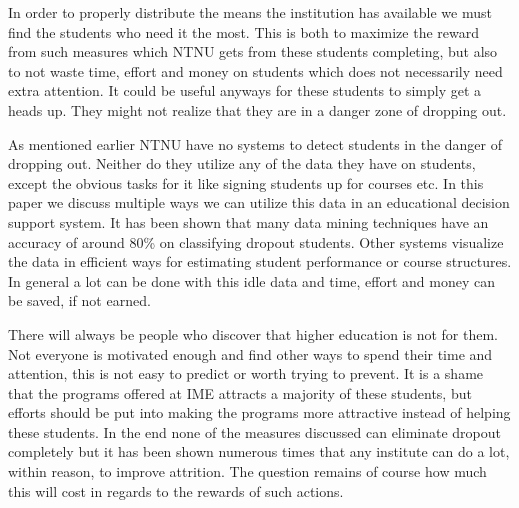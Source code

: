 \bigskip\noindent
In order to properly distribute the means the institution has available we must find the students who need it the most.
This is both to maximize the reward from such measures which NTNU gets from these students completing, but also to not waste time, effort and money on students which does not necessarily need extra attention.
It could be useful anyways for these students to simply get a heads up.
They might not realize that they are in a danger zone of dropping out.

\bigskip\noindent
As mentioned earlier NTNU have no systems to detect students in the danger of dropping out.
Neither do they utilize any of the data they have on students, except the obvious tasks for it like signing students up for courses etc. 
In this paper we discuss multiple ways we can utilize this data in an educational decision support system.
It has been shown that many data mining techniques have an accuracy of around 80\% on classifying dropout students.
Other systems visualize the data in efficient ways for estimating student performance or course structures. 
In general a lot can be done with this idle data and time, effort and money can be saved, if not earned.

\bigskip\noindent
There will always be people who discover that higher education is not for them.
Not everyone is motivated enough and find other ways to spend their time and attention, this is not easy to predict or worth trying to prevent.
It is a shame that the programs offered at IME attracts a majority of these students, but efforts should be put into making the programs more attractive instead of helping these students. 
In the end none of the measures discussed can eliminate dropout completely but it has been shown numerous times that any institute can do a lot, within reason, to improve attrition. 
The question remains of course how much this will cost in regards to the rewards of such actions.